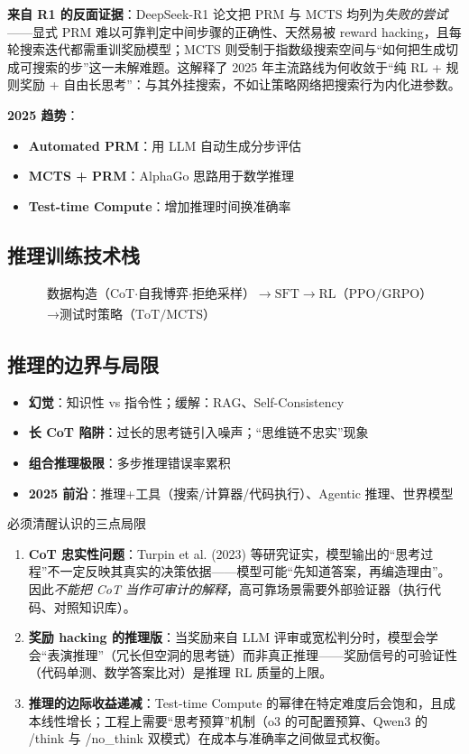\documentclass[12pt,a4paper]{article}
\begin{document}
\textbf{来自 R1 的反面证据}：DeepSeek-R1 论文把 PRM 与 MCTS 均列为\emph{失败的尝试}——显式 PRM 难以可靠判定中间步骤的正确性、天然易被 reward hacking，且每轮搜索迭代都需重训奖励模型；MCTS 则受制于指数级搜索空间与“如何把生成切成可搜索的步”这一未解难题。这解释了 2025 年主流路线为何收敛于“纯 RL + 规则奖励 + 自由长思考”：与其外挂搜索，不如让策略网络把搜索行为内化进参数。

\textbf{2025 趋势}：
\begin{itemize}
  \item \textbf{Automated PRM}：用 LLM 自动生成分步评估
  \item \textbf{MCTS + PRM}：AlphaGo 思路用于数学推理
  \item \textbf{Test-time Compute}：增加推理时间换准确率
\end{itemize}

\subsection{推理训练技术栈}

\[
\begin{aligned}
&\text{数据构造（CoT·自我博弈·拒绝采样）} \to \text{SFT} \to \text{RL（PPO/GRPO）}\\
&\to \text{测试时策略（ToT/MCTS）}
\end{aligned}
\]

\subsection{推理的边界与局限}

\begin{itemize}
  \item \textbf{幻觉}：知识性 vs 指令性；缓解：RAG、Self-Consistency
  \item \textbf{长 CoT 陷阱}：过长的思考链引入噪声；“思维链不忠实”现象
  \item \textbf{组合推理极限}：多步推理错误率累积
  \item \textbf{2025 前沿}：推理+工具（搜索/计算器/代码执行）、Agentic 推理、世界模型
\end{itemize}

\begin{warnbox}{必须清醒认识的三点局限}
\begin{enumerate}
  \item \textbf{CoT 忠实性问题}：Turpin et al. (2023) 等研究证实，模型输出的“思考过程”不一定反映其真实的决策依据——模型可能“先知道答案，再编造理由”。因此\emph{不能把 CoT 当作可审计的解释}，高可靠场景需要外部验证器（执行代码、对照知识库）。
  \item \textbf{奖励 hacking 的推理版}：当奖励来自 LLM 评审或宽松判分时，模型会学会“表演推理”（冗长但空洞的思考链）而非真正推理——奖励信号的可验证性（代码单测、数学答案比对）是推理 RL 质量的上限。
  \item \textbf{推理的边际收益递减}：Test-time Compute 的幂律在特定难度后会饱和，且成本线性增长；工程上需要“思考预算”机制（o3 的可配置预算、Qwen3 的 /think 与 /no\_think 双模式）在成本与准确率之间做显式权衡。
\end{enumerate}
\end{warnbox}
\end{document}
